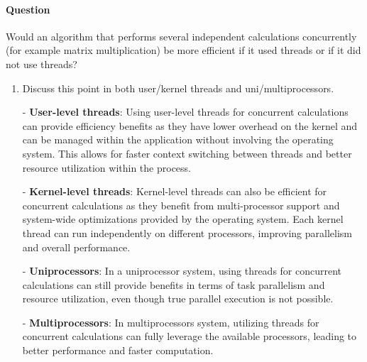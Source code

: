 \documentclass[a4paper,12pt,fleqn]{article}
\newcounter{question}
\newcommand*\question{%
\stepcounter{question}%
\paragraph{Question \thequestion}}
\begin{document}
\question 
{
Would an algorithm that performs several independent calculations concurrently (for example matrix multiplication) be more efficient if it used threads or if it did not use threads? 
}
\begin{enumerate}

\item
{
	Discuss this point in both user/kernel threads and uni/multiprocessors.
}
\begin{answer}
{

- \textbf{User-level threads}: Using user-level threads for concurrent calculations can provide efficiency benefits as they have lower overhead on the kernel and can be managed within the application without involving the operating system. This allows for faster context switching between threads and better resource utilization within the process.

- \textbf{Kernel-level threads}: Kernel-level threads can also be efficient for concurrent calculations as they benefit from multi-processor support and system-wide optimizations provided by the operating system. Each kernel thread can run independently on different processors, improving parallelism and overall performance.

- \textbf{Uniprocessors}: In a uniprocessor system, using threads for concurrent calculations can still provide benefits in terms of task parallelism and resource utilization, even though true parallel execution is not possible.
  
- \textbf{Multiprocessors}: In multiprocessors system, utilizing threads for concurrent calculations can fully leverage the available processors, leading to better performance and faster computation.
}
\end{answer}

\end{enumerate}

\end{document}
